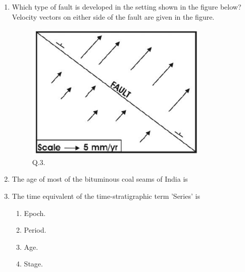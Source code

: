 \documentclass[journal,12pt,onecolumn]{IEEEtran}
\theoremstyle{remark}
\begin{document}
\begin{enumerate}
    \item Which type of fault is developed in the setting shown in the figure below? Velocity vectors on either side of the fault are given in the figure. \hfill{}
        \begin{figure}[h]
            \centering
            \includegraphics[width=0.5\columnwidth]{Figs/fig_2.png}
            \caption{Q.3.}
            \label{fig:placeholder_2}
        \end{figure}
        \begin{enumerate} 
        \end{enumerate}    
    
    \item The age of most of the bituminous coal seams of India is \hfill{}
        \begin{enumerate} 
        \end{enumerate}
        
    \item The time equivalent of the time-stratigraphic term 'Series' is \hfill{}
        \begin{enumerate} 
                \item Epoch.
                \item Period.
                \item Age.
                \item Stage.
        \end{enumerate}    
    

\end{enumerate}
\end{document}
